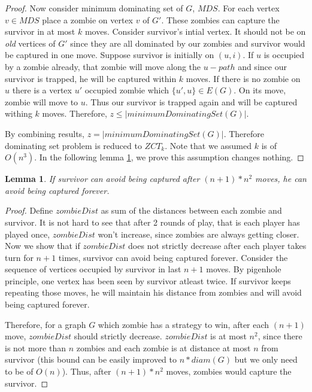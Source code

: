 \documentclass[1p]{elsarticle}
\newtheorem{lemma}[theorem]{Lemma}
\begin{document}
\begin{proof}
		Now consider minimum dominating set of $G$, $MDS$. For each vertex $v \in MDS$ place a zombie on vertex $v$
		of $G'$. These zombies can capture the survivor in at most $k$ moves. Consider survivor's intial vertex. It
		should not be on {\it old} vertices of $G'$ since they are all dominated by our zombies and survivor would be
		captured in one move. Suppose survivor is initially on $(u,i)$. If $u$ is occupied by a zombie already, that
		zombie will move along the $u-path$ and since our survivor is trapped, he will be captured within $k$ moves. If
		there is no zombie on $u$ there is a vertex $u'$ occupied zombie which $ \{u',u\} \in E(G)$. On its move, zombie
		will move to $u$. Thus our survivor is trapped again and will be captured withing $k$ moves. Therefore, $z \leq
		|minimumDominatingSet(G)|$.

		By combining results, $z = |minimumDominatingSet(G)|$. Therefore dominating set problem is reduced to $ZCT_k$.
		Note that we assumed $k$ is of $O(n^3)$. In the following lemma \ref{limit-moves}, we prove this assumption changes nothing.

	\end{proof}

	\begin{lemma}
		\label{limit-moves}
		If survivor can avoid being captured after $(n + 1) * n^2$ moves, he can avoid being captured forever.
	\end{lemma}
	\begin{proof}
		Define $zombieDist$ as sum of the distances between each zombie and survivor. It is not hard to see that after 2
		rounds of play, that is each player has played once, $zombieDist$ won't increase, since zombies are always
		getting closer. Now we show that if $zombieDist$ does not strictly decrease after each player takes turn for $n
		+ 1$ times, survivor can avoid being captured forever. Consider the sequence of vertices occupied by survivor in
		last $n + 1$ moves. By pigenhole principle, one vertex has been seen by survivor atleast twice. If survivor keeps
		repeating those moves, he will maintain his distance from zombies and will avoid being captured forever.

		Therefore, for a graph $G$ which zombie has a strategy to win, after each $(n + 1)$ move, $zombieDist$ should
		strictly decrease. $zombieDist$ is at most $n^2$, since there is not more than $n$ zombies and each zombie is at
		distance at most $n$ from survivor (this bound can be easily improved to $n * diam(G)$ but we only need to be of
		$O(n)$). Thus, after $(n + 1) * n^2$ moves, zombies would capture the survivor.
	\end{proof}
\end{document}
